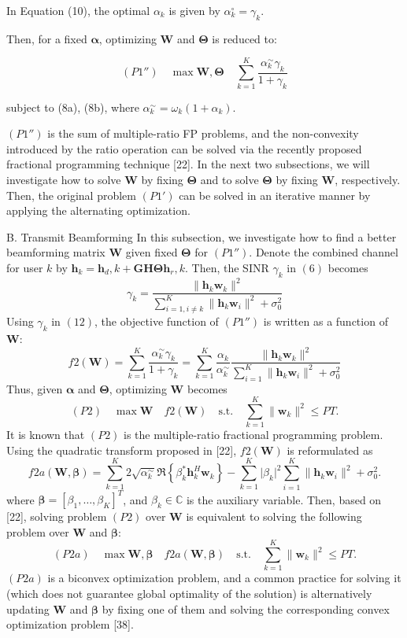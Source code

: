 \documentclass[review]{elsarticle}
\begin{document}
		In Equation (10), the optimal $\alpha_k$ is given by $\alpha_k^\circ = \gamma_k$.
		
		Then, for a fixed $\boldsymbol{\alpha}$, optimizing $\mathbf{W}$ and $\boldsymbol{\Theta}$ is reduced to:
		
		\[
		(P1'') \quad \max \mathbf{W}, \boldsymbol{\Theta} \quad \sum_{k=1}^{K} \frac{\alpha_k^\sim \gamma_k}{1 + \gamma_k}
		\]
		
		subject to (8a), (8b), where $\alpha_k^\sim = \omega_k(1 + \alpha_k)$.
		
		$(P1'')$ is the sum of multiple-ratio FP problems, and the non-convexity introduced by the ratio operation can be solved via the recently proposed fractional programming technique [22]. In the next two subsections, we will investigate how to solve $\mathbf{W}$ by fixing $\boldsymbol{\Theta}$ and to solve $\boldsymbol{\Theta}$ by fixing $\mathbf{W}$, respectively. Then, the original problem $(P1')$ can be solved in an iterative manner by applying the alternating optimization.
		
		B. Transmit Beamforming
		In this subsection, we investigate how to find a better beamforming matrix $\mathbf{W}$ given fixed $\boldsymbol{\Theta}$ for $(P1'')$. Denote the combined channel for user $k$ by $\mathbf{h}_k = \mathbf{h}_d,k + \mathbf{GH}\boldsymbol{\Theta}\mathbf{h}_r,k$. Then, the SINR $\gamma_k$ in $(6)$ becomes
		\[
		\gamma_k = \frac{{\lVert \mathbf{h}_k \mathbf{w}_k \rVert^2}}{{\sum_{i=1,i\neq k}^{K} \lVert \mathbf{h}_k \mathbf{w}_i \rVert^2 + \sigma_0^2}}
		\]
		Using $\gamma_k$ in $(12)$, the objective function of $(P1'')$ is written as a function of $\mathbf{W}$:
		\[
		f2(\mathbf{W}) = \sum_{k=1}^{K} \frac{\alpha_k^\sim \gamma_k}{{1 + \gamma_k}} = \sum_{k=1}^{K} \frac{\alpha_k}{\alpha_k^\sim} \frac{{\lVert \mathbf{h}_k \mathbf{w}_k \rVert^2}}{{\sum_{i=1}^{K} \lVert \mathbf{h}_k \mathbf{w}_i \rVert^2 + \sigma_0^2}}
		\]
		Thus, given $\boldsymbol{\alpha}$ and $\boldsymbol{\Theta}$, optimizing $\mathbf{W}$ becomes
		\[
		(P2) \quad \max \mathbf{W} \quad f2(\mathbf{W}) \quad \text{s.t.} \quad \sum_{k=1}^{K} \lVert \mathbf{w}_k \rVert^2 \leq PT.
		\]
		It is known that $(P2)$ is the multiple-ratio fractional programming problem. Using the quadratic transform proposed in [22], $f2(\mathbf{W})$ is reformulated as
		\[
		f2a(\mathbf{W}, \boldsymbol{\beta}) = \sum_{k=1}^{K} 2 \sqrt{\alpha_k^\sim} \Re \left\{ \beta_k^* \mathbf{h}_k^H \mathbf{w}_k \right\} - \sum_{k=1}^{K} \lvert \beta_k \rvert^2 \sum_{i=1}^{K} \lVert \mathbf{h}_k \mathbf{w}_i \rVert^2 + \sigma_0^2.
		\]
		where $\boldsymbol{\beta} = [\beta_1, \ldots, \beta_K]^T$, and $\beta_k \in \mathbb{C}$ is the auxiliary variable. Then, based on [22], solving problem $(P2)$ over $\mathbf{W}$ is equivalent to solving the following problem over $\mathbf{W}$ and $\boldsymbol{\beta}$:
		\[
		(P2a) \quad \max \mathbf{W}, \boldsymbol{\beta} \quad f2a(\mathbf{W}, \boldsymbol{\beta}) \quad \text{s.t.} \quad \sum_{k=1}^{K} \lVert \mathbf{w}_k \rVert^2 \leq PT.
		\]
		$(P2a)$ is a biconvex optimization problem, and a common practice for solving it (which does not guarantee global optimality of the solution) is alternatively updating $\mathbf{W}$ and $\boldsymbol{\beta}$ by fixing one of them and solving the corresponding convex optimization problem [38].
		
\end{document}
